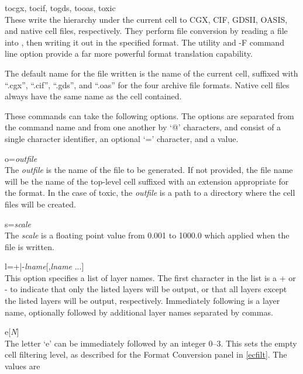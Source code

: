 \begin{description}
\item{\vt tocgx}, {\vt tocif}, {\vt togds}, {\vt tooas}, {\vt toxic}\\
These write the hierarchy under the current cell to CGX, CIF, GDSII,
OASIS, and native cell files, respectively.  They perform file
conversion by reading a file into {\Xic}, then writing it out in the
specified format.  The {\FileTool} utility and {\vt -F} command line
option provide a far more powerful format translation capability.

The default name for the file written is the name of the current cell,
suffixed with ``{\vt .cgx}'', ``{\vt .cif}'', ``{\vt .gds}'', and
``{\vt .oas}'' for the four archive file formats.  Native cell files
always have the same name as the cell contained.

These commands can take the following options.  The options are
separated from the command name and from one another by `{\vt @}'
characters, and consist of a single character identifier, an optional
`=' character, and a value.

\begin{description}
\item{\vt o=}{\it outfile}\\
The {\it outfile} is the name of the file to be generated.  If not
provided, the file name will be the name of the top-level cell
suffixed with an extension appropriate for the format.  In the case of
{\vt toxic}, the {\it outfile} is a path to a directory where the
cell files will be created.

\item{\vt s=}{\it scale}\\
The {\it scale} is a floating point value from 0.001 to 1000.0 which
applied when the file is written.

\item{\vt l=+|-}{\it lname\/}[{\vt ,}{\it lname} ...]\\
This option specifies a list of layer names.  The first character in
the list is a {\vt +} or {\vt -} to indicate that only the listed
layers will be output, or that all layers except the listed layers
will be output, respectively.  Immediately following is a layer name,
optionally followed by additional layer names separated by commas.

\item{\vt e}[{\it N\/}]\\
The letter `{\vt e}' can be immediately followed by an integer
0--3.  This sets the empty cell filtering level, as described for the
{\cb Format Conversion} panel in \ref{ecfilt}.  The values are


\end{description}
\end{description}
